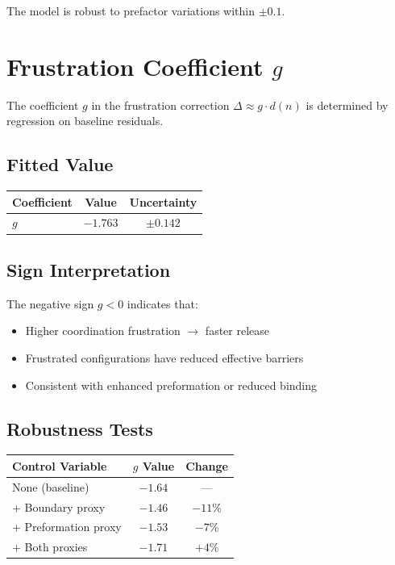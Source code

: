 The model is robust to prefactor variations within $\pm 0.1$.

\section{Frustration Coefficient $g$}
\label{sec:q:g}

The coefficient $g$ in the frustration correction $\Delta \approx g \cdot d(n)$
is determined by regression on baseline residuals.

\subsection{Fitted Value}

\begin{center}
\begin{tabular}{lcc}
    \toprule
    Coefficient & Value & Uncertainty \\
    \midrule
    $g$ & $-1.763$ & $\pm 0.142$ \\
    \bottomrule
\end{tabular}
\end{center}

\subsection{Sign Interpretation}

The negative sign $g < 0$ indicates that:
\begin{itemize}
    \item Higher coordination frustration $\to$ faster release
    \item Frustrated configurations have reduced effective barriers
    \item Consistent with enhanced preformation or reduced binding
\end{itemize}

\subsection{Robustness Tests}

\begin{center}
\begin{tabular}{lcc}
    \toprule
    Control Variable & $g$ Value & Change \\
    \midrule
    None (baseline) & $-1.64$ & --- \\
    + Boundary proxy & $-1.46$ & $-11\%$ \\
    + Preformation proxy & $-1.53$ & $-7\%$ \\
    + Both proxies & $-1.71$ & $+4\%$ \\
    \bottomrule
\end{tabular}
\end{center}


